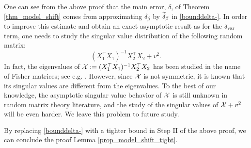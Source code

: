 One can see from the above proof that the main error, $\delta$, of Theorem \ref{thm_model_shift} comes from approximating $\delta_{\beta}$ by $\wt\delta_{\beta}$ in \eqref{bounddelta-}. In order to improve this estimate and obtain an exact asymptotic result as for the $\delta_{\vari}$ term, one needs to study the singular value distribution of the following random matrix:
$$(X_1^{\top}X_1)^{-1}X_2^{\top}X_2 +  {v}^2 .$$
In fact, the eigenvalues of $\cal X:=(X_1^{\top}X_1)^{-1}X_2^{\top}X_2$ has been studied in the name of Fisher matrices; see e.g. \cite{Fmatrix}. However, since $\cal X$ is not symmetric, it is known that its singular values are different from the eigenvalues. To the best of our knowledge, the asymptotic singular value behavior of $\cal X$ is still unknown in random matrix theory literature, and the study of the singular values of $\cal X + v^2$ will be even harder. We leave this problem to future study.


By replacing \eqref{bounddelta-} with a tighter bound in Step II of the above proof, we can conclude the proof Lemma \ref{prop_model_shift_tight}.

